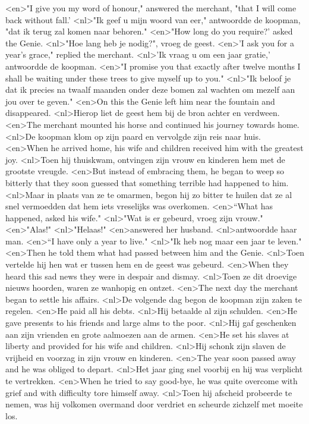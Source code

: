 <en>"I give you my word of honour," answered the merchant, "that I will come back without fall.’ 
<nl>"Ik geef u mijn woord van eer," antwoordde de koopman, "dat ik  terug zal komen naar behoren."
<en>"How long do you require?’ asked the Genie.
<nl>"Hoe lang heb je nodig?", vroeg de geest.
<en>'I ask you for a year's grace," replied the merchant.
<nl>'Ik vraag u om een jaar gratie,' antwoordde de koopman.
<en>"I promise you that exactly after twelve months I shall be waiting under these trees to give myself up to you."
<nl>"Ik beloof je dat ik precies na twaalf maanden onder deze bomen zal wachten om mezelf aan jou over te geven."
<en>On this the Genie left him near the fountain and disappeared.
<nl>Hierop liet de geest hem bij de bron achter en verdween.
<en>The merchant mounted his horse and continued his journey towards home.
<nl>De koopman klom op zijn paard en vervolgde zijn reis naar huis.
<en>When he arrived home, his wife and children received him with the greatest joy.
<nl>Toen hij thuiskwam, ontvingen zijn vrouw en kinderen hem met de grootste vreugde.
<en>But instead of embracing them, he began to weep so bitterly that they soon guessed that something terrible had happened to him.
<nl>Maar in plaats van ze te omarmen, begon hij zo bitter te huilen dat ze al snel vermoedden dat hem iets vreselijks was overkomen.
<en>“What has happened, asked his wife."
<nl>"Wat is er gebeurd, vroeg zijn vrouw."
<en>"Alas!"
<nl>"Helaas!"
<en>answered her husband.
<nl>antwoordde haar man.
<en>“I have only a year to live."
<nl>"Ik heb nog maar een jaar te leven."
<en>Then he told them what had passed between him and the Genie.
<nl>Toen vertelde hij hen wat er tussen hem en de geest was gebeurd.
<en>When they heard this sad news they were in despair and dismay.
<nl>Toen ze dit droevige nieuws hoorden, waren ze wanhopig en ontzet.
<en>The next day the merchant began to settle his affairs.
<nl>De volgende dag begon de koopman zijn zaken te regelen.
<en>He paid all his debts.
<nl>Hij betaalde al zijn schulden.
<en>He gave presents to his friends and large alms to the poor.
<nl>Hij gaf geschenken aan zijn vrienden en grote aalmoezen aan de armen.
<en>He set his slaves at liberty and provided for his wife and children.
<nl>Hij schonk zijn slaven de vrijheid en voorzag in zijn vrouw en kinderen.
<en>The year soon passed away and he was obliged to depart.
<nl>Het jaar ging snel voorbij en hij was verplicht te vertrekken.
<en>When he tried to say good-bye, he was quite overcome with grief and with difficulty tore himself away.
<nl>Toen hij afscheid probeerde te nemen, was hij volkomen overmand door verdriet en scheurde  zichzelf met moeite los.
